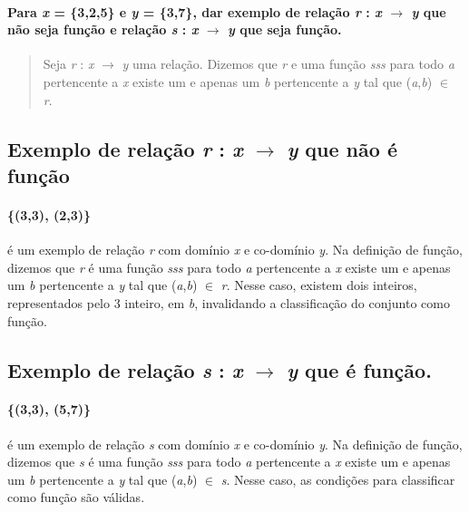 
\paragraph{Para \textit{x} = \{3,2,5\} e \textit{y} = \{3,7\}, dar exemplo de relação \textit{r} : \textit{x} $\rightarrow$ \textit{y} que não seja função e relação  \textit{s} : \textit{x} $\rightarrow$ \textit{y} que seja função.}

\begin{quote}
	
	Seja \textit{r}  : \textit{x} $\rightarrow$ \textit{y} uma relação. Dizemos que \textit{r} e uma função \textit{sss} para todo \textit{a} pertencente a \textit{x} existe um e apenas um \textit{b} pertencente a \textit{y} tal que (\textit{a},\textit{b}) $\in$ \textit{r}.
\end{quote}


\subsection{Exemplo de relação \textit{r} : \textit{x} $\rightarrow$ \textit{y} que não é função}
	\paragraph{\{(3,3), (2,3)\}}
	é um exemplo de relação \textit{r} com domínio \textit{x} e co-domínio \textit{y}. Na definição de função, dizemos que \textit{r} é uma função \textit{sss} para todo \textit{a} pertencente a \textit{x} existe um e apenas um \textit{b} pertencente a \textit{y} tal que (\textit{a},\textit{b}) $\in$ \textit{r}. Nesse caso, existem dois inteiros, representados pelo 3 inteiro, em \textit{b}, invalidando a classificação do conjunto como função.
	

\subsection{Exemplo de relação  \textit{s} : \textit{x} $\rightarrow$ \textit{y} que é função.}
	\paragraph{\{(3,3), (5,7)\}}
	é um exemplo de relação \textit{s} com domínio \textit{x} e co-domínio \textit{y}. Na definição de função, dizemos que \textit{s} é uma função \textit{sss} para todo \textit{a} pertencente a \textit{x} existe um e apenas um \textit{b} pertencente a \textit{y} tal que (\textit{a},\textit{b}) $\in$ \textit{s}. Nesse caso, as condições para classificar como função são válidas. 

